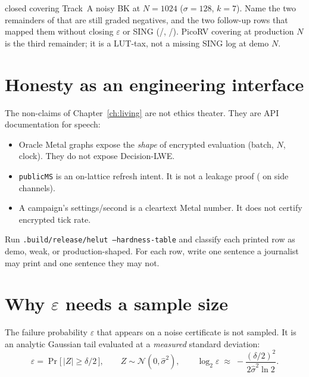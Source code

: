 \begin{exercise}
 closed covering Track~A noisy BK at $N{=}1024$ ($\sigma{=}128$, $k{=}7$).
Name the two remainders of  that are still graded negatives, and the
two follow-up rows that mapped them without closing $\varepsilon$ or SING
(/, /). PicoRV covering at production $N$ is
the third remainder; it is a LUT-tax, not a missing SING log at demo $N$.
\end{exercise}

\section{Honesty as an engineering interface}

The non-claims of Chapter~\ref{ch:living} are not ethics theater.
They are API documentation for speech:

\begin{itemize}
  \item Oracle Metal graphs expose the \emph{shape} of encrypted evaluation
        (batch, $N$, clock). They do not expose Decision-LWE.
  \item \texttt{publicMS} is an on-lattice refresh intent. It is not a
        leakage proof ( on side channels).
  \item A campaign's settings/second is a cleartext Metal number. It does
        not certify encrypted tick rate.
\end{itemize}

\begin{lab}
Run \texttt{.build/release/helut --hardness-table} and classify each printed
row as demo, weak, or production-shaped.
For each row, write one sentence a journalist may print and one sentence
they may not.
\end{lab}


\section{\texorpdfstring{Why $\varepsilon$ needs a sample size}{Why epsilon needs a sample size}}
\label{sec:eps-samples}

The failure probability $\varepsilon$ that appears on a noise certificate is not
sampled. It is an analytic Gaussian tail evaluated at a \emph{measured} standard
deviation:
\[
  \varepsilon = \Pr\bigl[\,|Z| \ge \delta/2\,\bigr],
  \qquad Z \sim \mathcal{N}(0,\hat\sigma^2),
  \qquad
  \log_2\varepsilon \;\approx\; -\frac{(\delta/2)^2}{2\hat\sigma^2\ln 2}.
\]

